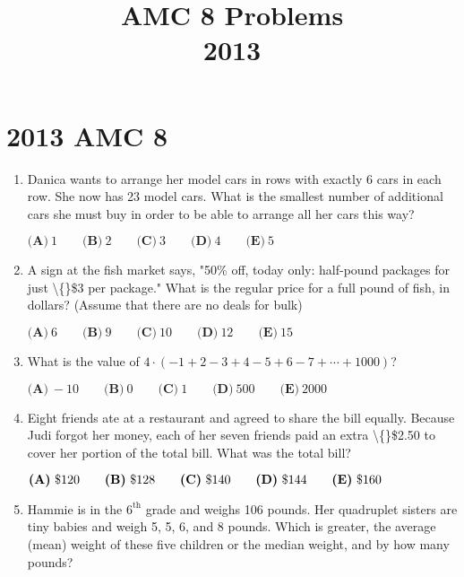 \documentclass{article}
\title{AMC 8 Problems \\ 2013}
\date{}
\begin{document}
\maketitle\thispagestyle{fancy}\newpage\section*{2013 AMC 8}\begin{enumerate}[label=\arabic*., itemsep=0.5em]\item Danica wants to arrange her model cars in rows with exactly 6 cars in each row. She now has 23 model cars. What is the smallest number of additional cars she must buy in order to be able to arrange all her cars this way?

\(\textbf{(A)}\ 1 \qquad \textbf{(B)}\ 2 \qquad \textbf{(C)}\ 3 \qquad \textbf{(D)}\ 4 \qquad \textbf{(E)}\ 5\)\par \vspace{0.5em}\item A sign at the fish market says, "50\% off, today only: half-pound packages for just \textbackslash\{\}\$3 per package." What is the regular price for a full pound of fish, in dollars? (Assume that there are no deals for bulk)

\(\textbf{(A)}\ 6 \qquad \textbf{(B)}\ 9 \qquad \textbf{(C)}\ 10 \qquad \textbf{(D)}\ 12 \qquad \textbf{(E)}\ 15\)\par \vspace{0.5em}\item What is the value of \(4 \cdot (-1+2-3+4-5+6-7+\cdots+1000)\)?

\(\textbf{(A)}\ -10 \qquad \textbf{(B)}\ 0 \qquad \textbf{(C)}\ 1 \qquad \textbf{(D)}\ 500 \qquad \textbf{(E)}\ 2000\)\par \vspace{0.5em}\item Eight friends ate at a restaurant and agreed to share the bill equally. Because Judi forgot her money, each of her seven friends paid an extra \textbackslash\{\}\$2.50 to cover her portion of the total bill. What was the total bill?

\( \textbf{(A)}\ \text{\textdollar}120\qquad\textbf{(B)}\ \text{\textdollar}128\qquad\textbf{(C)}\ \text{\textdollar}140\qquad\textbf{(D)}\ \text{\textdollar}144\qquad\textbf{(E)}\ \text{\textdollar}160 \)\par \vspace{0.5em}\item Hammie is in the \(6^\text{th}\) grade and weighs 106 pounds. Her quadruplet sisters are tiny babies and weigh 5, 5, 6, and 8 pounds. Which is greater, the average (mean) weight of these five children or the median weight, and by how many pounds?


\end{enumerate}
\end{document}

